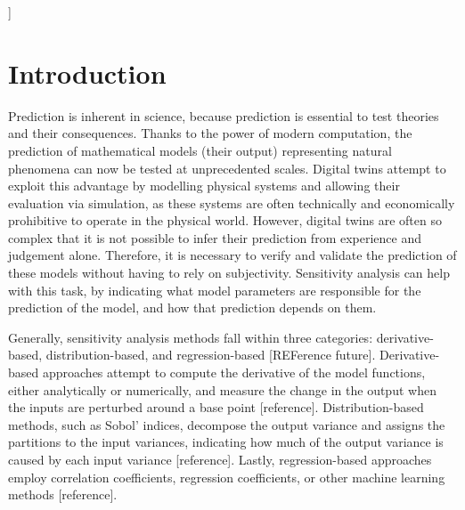 \documentclass[twocolumn]{rps-esrl2020}
\begin{document}

]

\section{Introduction}

Prediction is inherent in science, because prediction is essential to test theories and their consequences.
Thanks to the power of modern computation, the prediction of mathematical models (their output) representing natural phenomena can now be tested at unprecedented scales.
Digital twins attempt to exploit this advantage by modelling physical systems and allowing their evaluation via simulation, as these systems are often technically and
economically prohibitive to operate in the physical world.
However, digital twins are often so complex that it is not possible to infer their prediction from experience and judgement alone.
Therefore, it is necessary to verify and validate the prediction of these models without having to rely on subjectivity.
Sensitivity analysis can help with this task, by indicating what model parameters are responsible for the prediction of the model, and how
that prediction depends on them.

Generally, sensitivity analysis methods fall within three categories: derivative-based, distribution-based, and regression-based [REFerence future].
Derivative-based approaches attempt to compute the derivative of the model functions, either analytically or numerically, and measure the change in
the output when the inputs are perturbed around a base point [reference].
Distribution-based methods, such as Sobol' indices, decompose the output variance and assigns the partitions to the input variances, indicating how much
of the output variance is caused by each input variance [reference].
Lastly, regression-based approaches employ correlation coefficients, regression coefficients, or other machine learning methods [reference].
\end{document}
